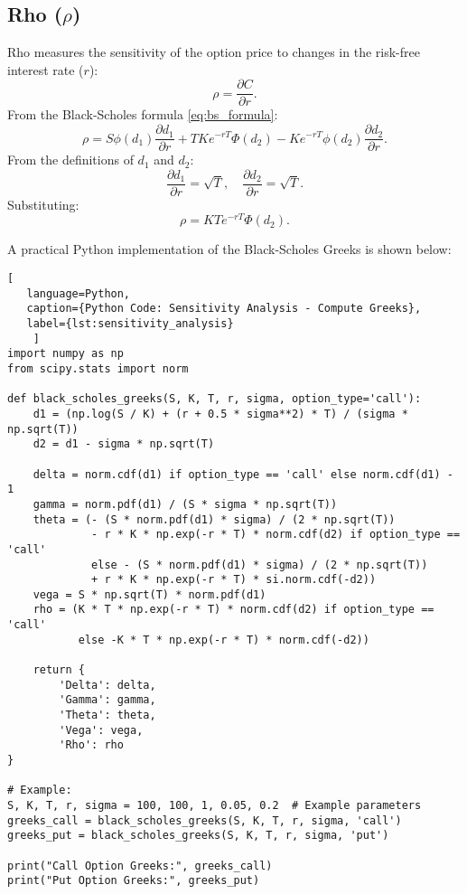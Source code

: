     \subsection{Rho ($\rho$)}
    Rho measures the sensitivity of the option price to changes in the risk-free interest rate ($r$):
        \begin{equation}
            \rho = \frac{\partial C}{\partial r}.
            \label{eq:rho_definition}
        \end{equation}
        From the Black-Scholes formula \eqref{eq:bs_formula}:
        \begin{equation}
            \rho = S \phi(d_1) \frac{\partial d_1}{\partial r}
                + T K e^{-rT} \Phi(d_2) - K e^{-rT} \phi(d_2) \frac{\partial d_2}{\partial r}.
            \label{eq:rho_derivation}
        \end{equation}
        From the definitions of $d_1$ and $d_2$:
        \begin{equation}
            \frac{\partial d_1}{\partial r} = \sqrt{T}, \quad \frac{\partial d_2}{\partial r} = \sqrt{T}.
            \label{eq:rho_d1_d2_derivatives}
        \end{equation}
        Substituting:
        \begin{equation}
            \rho = K T e^{-rT} \Phi(d_2).
            \label{eq:rho_result}
        \end{equation}

    A practical Python implementation of the Black-Scholes Greeks is shown below:

            \begin{lstlisting}[
   language=Python,
   caption={Python Code: Sensitivity Analysis - Compute Greeks},
   label={lst:sensitivity_analysis}
    ]
import numpy as np
from scipy.stats import norm

def black_scholes_greeks(S, K, T, r, sigma, option_type='call'):
    d1 = (np.log(S / K) + (r + 0.5 * sigma**2) * T) / (sigma * np.sqrt(T))
    d2 = d1 - sigma * np.sqrt(T)

    delta = norm.cdf(d1) if option_type == 'call' else norm.cdf(d1) - 1
    gamma = norm.pdf(d1) / (S * sigma * np.sqrt(T))
    theta = (- (S * norm.pdf(d1) * sigma) / (2 * np.sqrt(T))
             - r * K * np.exp(-r * T) * norm.cdf(d2) if option_type == 'call'
             else - (S * norm.pdf(d1) * sigma) / (2 * np.sqrt(T))
             + r * K * np.exp(-r * T) * si.norm.cdf(-d2))
    vega = S * np.sqrt(T) * norm.pdf(d1)
    rho = (K * T * np.exp(-r * T) * norm.cdf(d2) if option_type == 'call'
           else -K * T * np.exp(-r * T) * norm.cdf(-d2))

    return {
        'Delta': delta,
        'Gamma': gamma,
        'Theta': theta,
        'Vega': vega,
        'Rho': rho
}

# Example:
S, K, T, r, sigma = 100, 100, 1, 0.05, 0.2  # Example parameters
greeks_call = black_scholes_greeks(S, K, T, r, sigma, 'call')
greeks_put = black_scholes_greeks(S, K, T, r, sigma, 'put')

print("Call Option Greeks:", greeks_call)
print("Put Option Greeks:", greeks_put)

   \end{lstlisting}

